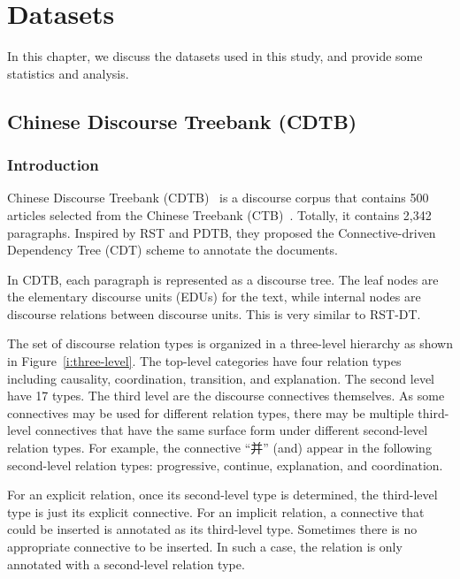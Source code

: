 %
%
%
\chapter{Datasets}
\label{c:datasets}

In this chapter, we discuss the datasets used in this study, and
provide some statistics and analysis.

\section{Chinese Discourse Treebank (CDTB)}
\label{s:CDTB}
\subsection{Introduction}

Chinese Discourse Treebank (CDTB)~\citep{li2014building} is a discourse
corpus that contains 500 articles selected from the Chinese Treebank (CTB)~\citep{xue2005penn}.
Totally, it contains 2,342 paragraphs.
Inspired by RST and PDTB, they proposed the Connective-driven Dependency Tree (CDT)
scheme to annotate the documents.

In CDTB, each paragraph is represented as a discourse tree. The leaf nodes are the
elementary discourse units (EDUs) for the text, while internal nodes are discourse
relations between discourse units. This is very similar to RST-DT.

The set of discourse relation types is organized in a three-level hierarchy as
shown in Figure~\ref{i:three-level}.
The top-level categories have four relation types including causality, coordination,
transition, and explanation. The second level
have 17 types. The third level are the discourse connectives themselves.
As some connectives may be used for different relation types, there may
be multiple third-level connectives that have the same surface form under
different second-level relation types. For example, the connective
``并'' (and) appear in the following second-level relation types:
progressive, continue, explanation, and coordination.



For an explicit relation, once its second-level type is determined, the
third-level type is just its explicit connective. For an implicit relation,
a connective that could be inserted is annotated as its third-level type.
Sometimes there is no appropriate connective to be inserted. In such a case,
the relation is only annotated with a second-level relation type.

